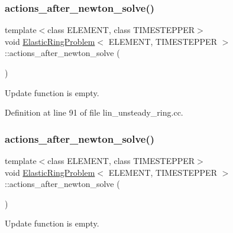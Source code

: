 \subsubsection{\texorpdfstring{actions\+\_\+after\+\_\+newton\+\_\+solve()}{actions\_after\_newton\_solve()}\hspace{0.1cm}{\footnotesize\ttfamily [1/2]}}
{\footnotesize\ttfamily template$<$class E\+L\+E\+M\+E\+NT, class T\+I\+M\+E\+S\+T\+E\+P\+P\+ER$>$ \\
void \hyperlink{classElasticRingProblem}{Elastic\+Ring\+Problem}$<$ E\+L\+E\+M\+E\+NT, T\+I\+M\+E\+S\+T\+E\+P\+P\+ER $>$\+::actions\+\_\+after\+\_\+newton\+\_\+solve (\begin{DoxyParamCaption}{ }\end{DoxyParamCaption})\hspace{0.3cm}{\ttfamily [inline]}}



Update function is empty. 



Definition at line 91 of file lin\+\_\+unsteady\+\_\+ring.\+cc.

\mbox{\label{classElasticRingProblem_ab0eb0dcecfa7e9c9e52ecf319f6e873e}} 
\subsubsection{\texorpdfstring{actions\+\_\+after\+\_\+newton\+\_\+solve()}{actions\_after\_newton\_solve()}\hspace{0.1cm}{\footnotesize\ttfamily [2/2]}}
{\footnotesize\ttfamily template$<$class E\+L\+E\+M\+E\+NT, class T\+I\+M\+E\+S\+T\+E\+P\+P\+ER$>$ \\
void \hyperlink{classElasticRingProblem}{Elastic\+Ring\+Problem}$<$ E\+L\+E\+M\+E\+NT, T\+I\+M\+E\+S\+T\+E\+P\+P\+ER $>$\+::actions\+\_\+after\+\_\+newton\+\_\+solve (\begin{DoxyParamCaption}{ }\end{DoxyParamCaption})\hspace{0.3cm}{\ttfamily [inline]}}



Update function is empty. 



